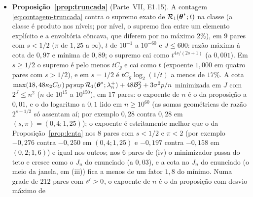 \documentclass[11pt,a4paper]{article}
\newcommand{\smax}{\widehat{\sigma}_{\max}}
\begin{document}
\begin{itemize}[nosep, leftmargin=*]
    \eqref{eq:smax-teto}, com $n = 250$ e $1000$ e $J = 5$ a $10$ ($20$
    réplicas): razão máxima de $\smax^{2}$ à cota de $0{,}27$; abaixo do teto
    $\smax^{2} \le 2B_{X}^{2}C_{U}$ sempre, e com $2^{J} > 4n$ nunca, de modo
    que o fator $\mu_{J}$ é necessário; $n\smax^{2}/2^{J}$ desce de $11{,}7$ a
    $2{,}3$ em $n = 250$. Em ajustes ($n = 250$ e
    $500$, $6$ réplicas, $J$ acima do teto, $d$ até $2044$) com
    $(s,\pi) = (0{,}6;1)$, $(0{,}4;1{,}25)$ e $(0{,}5;1{,}2)$: cobertura de
    $\mathcal{T}$ igual a $1{,}000$ com $\pen_{n}^{+}$ e com $2\pen_{0}$,
    nenhuma violação do Teorema~1(i) de E1.5 nem da cota, folga mínima de
    $78$ vezes; com $\pen_{n}^{+}$, de $2{,}1$ a $3{,}1$ vezes $\pen_{n}$, o
    ajuste é nulo nos três pares e a cota vale trivialmente, e com $2\pen_{0}$
    não.
  \item \textbf{Proposição~\ref{prop:truncada}} (Parte~VII, E1.15). A
    contagem \eqref{eq:contagem-truncada} contra o supremo exato de
    $\mathcal{R}_{1}(\boldsymbol{\theta}^{*};t)$ na classe (a classe é produto nos níveis;
    por nível, o supremo fica entre um elemento explícito e a envoltória
    côncava, que diferem por no máximo $2\%$), em $9$ pares com $s < 1/2$
    ($\pi$ de $1{,}25$ a $\infty$), $t$ de $10^{-1}$ a $10^{-60}$ e
    $J \le 600$: razão máxima à cota de $0{,}97$ e mínima de $0{,}89$; o
    supremo cai como $t^{4s/(2s+1)}$ (a $0{,}001$). Em $s \ge 1/2$ o supremo é
    pelo menos $tC_{g}$ e cai como $t$ (expoente $1{,}000$ em quatro pares com
    $s > 1/2$), e em $s = 1/2$ é $tC_{g}\log_{2}(1/t)$ a menos de $17\%$. A
    cota $\max(18,48\kappa_{2}C_{U})\,pq\sup\mathcal{R}_{1}(\boldsymbol{\theta}^{*};\lambda_{n}^{+})
    + 48\mathcal{B}_{J}^{2} + 3\sigma^{2}p/n$ minimizada em $J$ com
    $2^{J} \le n^{2}$ ($n$ de $10^{15}$ a $10^{150}$), em $17$ pares: o
    expoente de $n$ é o da proposição a $0{,}01$, e o do logaritmo a $0{,}1$
    lido em $n \ge 10^{60}$ (as somas geométricas de razão $2^{s-1/2}$ só
    assentam aí; por exemplo $0{,}28$ contra $0{,}28$ em $(s,\pi) =
    (0{,}4;1{,}25)$); o expoente é estritamente melhor que o da
    Proposição~\ref{prop:lenta} nos $8$ pares com $s < 1/2$ e $\pi < 2$ (por
    exemplo $-0{,}276$ contra $-0{,}250$ em $(0{,}4;1{,}25)$ e $-0{,}197$
    contra $-0{,}158$ em $(0{,}2;1{,}6)$) e igual nos outros; nos $6$ pares de
    (iv) o minimizador passa do teto e cresce como o $J_{n}$ do enunciado (a
    $0{,}03$), e a cota no $J_{n}$ do enunciado (o meio da janela, em (iii))
    fica a menos de um fator $1{,}8$ do mínimo. Numa grade de $212$ pares com
    $s' > 0$, o expoente de $n$ é o da proposição com desvio máximo de

\end{itemize}
\end{document}
